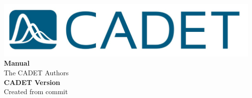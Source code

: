 \documentclass[%
a4paper, %
DIV=14,
BCOR=8mm,
10pt,
titlepage,
twoside,
toc=bibliography,
toc=index,
toc=listof,
toc=graduated,
]{scrreprt}
\newcommand{\CADET}{CADET}
\begin{document}
%
\begin{titlepage}%
	\setcounter{page}{-100}%
	\begin{center}
		\includegraphics[width=0.6\linewidth]{../logo/CADET-Logo} \\
		\vspace{8cm}
		{\Huge\textbf{Manual}}\\
		\vspace{3cm}
		{The \CADET{} Authors}\\
		\vspace{5cm}
		\textbf{\CADET{} Version }\\
		\vspace{0.8cm}
		{\footnotesize Created from commit }
	\end{center}
\end{titlepage}

\newpage
\cleardoublepage

\tableofcontents

\newpage
\listoffigures

\newpage
\listoftables

\newpage
{}

%






\printbibliography

\printindex
\end{document}
